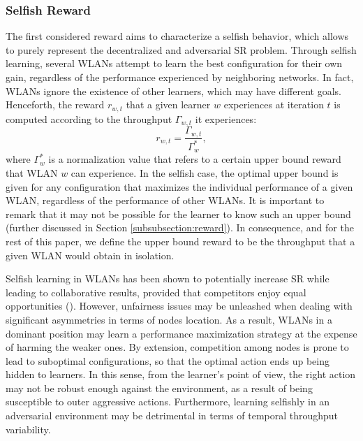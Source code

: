 \documentclass[preprint,12pt]{elsarticle}
\begin{document}
\subsubsection{Selfish Reward}
\label{subsubsection:selfish_learning}
The first considered reward aims to characterize a selfish behavior, which allows to purely represent the decentralized and adversarial SR problem. Through selfish learning, several WLANs attempt to learn the best configuration for their own gain, regardless of the performance experienced by neighboring networks. In fact, WLANs ignore the existence of other learners, which may have different goals. Henceforth, the reward $r_{w,t}$ that a given learner $w$ experiences at iteration $t$ is computed according to the throughput $\Gamma_{w,t}$ it experiences: 
\begin{equation}
r_{w,t} = \frac{\Gamma_{w,t}}{\Gamma_w^*}, 
\nonumber
\end{equation}		
where $\Gamma_w^*$ is a normalization value that refers to a certain upper bound reward that WLAN $w$ can experience. In the selfish case, the optimal upper bound is given for any configuration that maximizes the individual performance of a given WLAN, regardless of the performance of other WLANs. It is important to remark that it may not be possible for the learner to know such an upper bound (further discussed in Section \ref{subsubsection:reward}). In consequence, and for the rest of this paper, we define the upper bound reward to be the throughput that a given WLAN would obtain in isolation.

Selfish learning in WLANs has been shown to potentially increase SR while leading to collaborative results, provided that competitors enjoy equal opportunities (\citealp{wilhelmi2017collaborative}). However, unfairness issues may be unleashed when dealing with significant asymmetries in terms of nodes location. As a result, WLANs in a dominant position may learn a performance maximization strategy at the expense of harming the weaker ones. By extension, competition among nodes is prone to lead to suboptimal configurations, so that the optimal action ends up being hidden to learners. In this sense, from the learner's point of view, the right action may not be robust enough against the environment, as a result of being susceptible to outer aggressive actions. Furthermore, learning selfishly in an adversarial environment may be detrimental in terms of temporal throughput variability. 

\end{document}
